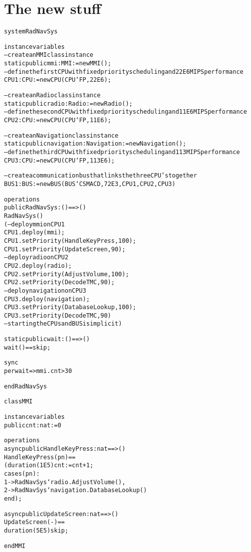 %
%

\section{The new stuff}

\begin{alltt}
system RadNavSys

instance variables
  -- create an MMI class instance
  static public mmi : MMI := new MMI();
  -- define the first CPU with fixed priority scheduling and 22E6 MIPS performance
  CPU1 : CPU := new CPU (CPU`FP, 22E6);

  -- create an Radio class instance
  static public radio : Radio := new Radio();
  -- define the second CPU with fixed priority scheduling and 11E6 MIPS performance
  CPU2 : CPU := new CPU (CPU`FP, 11E6);

  -- create an Navigation class instance
  static public navigation : Navigation := new Navigation();
  -- define the third CPU with fixed priority scheduling and 113 MIPS performance
  CPU3 : CPU := new CPU (CPU`FP, 113E6); 

  -- create a communication bus that links the three CPU's together
  BUS1 : BUS := new BUS (BUS`CSMACD, 72E3, {CPU1, CPU2, CPU3})

operations
  public RadNavSys: () ==> ()
  RadNavSys ()
    ( -- deploy mmi on CPU1
      CPU1.deploy(mmi);
      CPU1.setPriority(HandleKeyPress,100);
      CPU1.setPriority(UpdateScreen,90);
      -- deploy radio on CPU2
      CPU2.deploy(radio);
      CPU2.setPriority(AdjustVolume,100);
      CPU2.setPriority(DecodeTMC,90);
      -- deploy navigation on CPU3
      CPU3.deploy(navigation);
      CPU3.setPriority(DatabaseLookup, 100);
      CPU3.setPriority(DecodeTMC, 90)
      -- starting the CPUs and BUS is implicit )

  static public wait: () ==> ()
  wait () == skip;

  sync
    per wait => mmi.cnt > 30

end RadNavSys
\end{alltt}

\begin{alltt}
class MMI

instance variables
  public cnt : nat := 0

operations
  async public HandleKeyPress: nat ==> ()
  HandleKeyPress (pn) ==
    ( duration (1E5) cnt := cnt + 1;
      cases (pn):
        1 -> RadNavSys`radio.AdjustVolume(),
        2 -> RadNavSys`navigation.DatabaseLookup()
      end );

  async public UpdateScreen: nat ==> ()
  UpdateScreen (-) ==
    duration (5E5) skip;

end MMI
\end{alltt}

